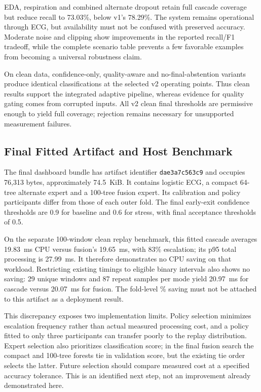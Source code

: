 \documentclass[conference,a4paper]{IEEEtran}
\newcommand{\pct}{\%}
\begin{document}
EDA, respiration and combined alternate dropout retain full cascade coverage but reduce recall to 73.03\pct{}, below v1's 78.29\pct{}. The system remains operational through ECG, but availability must not be confused with preserved accuracy. Moderate noise and clipping show improvements in the reported recall/F1 tradeoff, while the complete scenario table prevents a few favorable examples from becoming a universal robustness claim.

On clean data, confidence-only, quality-aware and no-final-abstention variants produce identical classifications at the selected v2 operating points. Thus clean results support the integrated adaptive pipeline, whereas evidence for quality gating comes from corrupted inputs. All v2 clean final thresholds are permissive enough to yield full coverage; rejection remains necessary for unsupported measurement failures.

\subsection{Final Fitted Artifact and Host Benchmark}
The final dashboard bundle has artifact identifier \texttt{dae3a7c563c9} and occupies 76,313 bytes, approximately 74.5~KiB. It contains logistic ECG, a compact 64-tree alternate expert and a 100-tree fusion expert. Its calibration and policy participants differ from those of each outer fold. The final early-exit confidence thresholds are 0.9 for baseline and 0.6 for stress, with final acceptance thresholds of 0.5.

On the separate 100-window clean replay benchmark, this fitted cascade averages 19.83~ms CPU versus fusion's 19.65~ms, with 83\pct{} escalation; its p95 total processing is 27.99~ms. It therefore demonstrates no CPU saving on that workload. Restricting existing timings to eligible binary intervals also shows no saving: 29 unique windows and 87 repeat samples per mode yield 20.97~ms for cascade versus 20.07~ms for fusion. The fold-level \CpuSaving\pct{} saving must not be attached to this artifact as a deployment result.

This discrepancy exposes two implementation limits. Policy selection minimizes escalation frequency rather than actual measured processing cost, and a policy fitted to only three participants can transfer poorly to the replay distribution. Expert selection also prioritizes classification score; in the final fusion search the compact and 100-tree forests tie in validation score, but the existing tie order selects the latter. Future selection should compare measured cost at a specified accuracy tolerance. This is an identified next step, not an improvement already demonstrated here.
\end{document}
